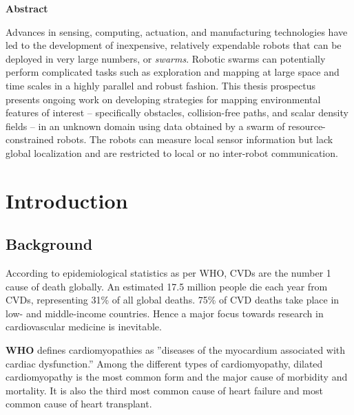 \documentclass[11pt]{article} %
\begin{document}
	\thispagestyle{empty}
	\begin{center}
		\begin{minipage}{\linewidth}
			\vspace{3cm}
			{\centering \bf{Abstract}\par}
			\vspace{0.5cm}
			Advances in sensing, computing, actuation, and manufacturing technologies have led to the development of inexpensive,  relatively expendable robots that can be deployed in very large numbers, or \textit{swarms}. Robotic swarms can potentially perform complicated tasks such as exploration and mapping at large space and time scales in a highly parallel and robust fashion. This thesis prospectus presents ongoing work on developing strategies for mapping environmental features of interest -- specifically obstacles, collision-free paths, and scalar density fields -- in an unknown domain using data obtained by a swarm of resource-constrained robots.  The robots can measure local sensor information but lack global localization and are restricted to local or no inter-robot communication.			
			
		\end{minipage}
	\end{center}
	\clearpage
	
	\tableofcontents
	\newpage

\section{Introduction}
\label{sec:Intro}



\subsection{Background}
\label{subsec:background}

According to epidemiological statistics as per WHO, CVDs are the number 1 cause of
death globally. An estimated 17.5 million people die each year from CVDs, representing 31\% of
all global deaths. 75\% of CVD deaths take place in low- and middle-income countries. Hence a
major focus towards research in cardiovascular medicine is inevitable.

\textbf{WHO} defines cardiomyopathies as ''diseases of the myocardium associated with cardiac dysfunction.'' Among the different types of cardiomyopathy, dilated cardiomyopathy is the most common form and the major cause of morbidity and mortality. It is also the third most common cause of heart failure and most common cause of heart transplant.
\end{document}
